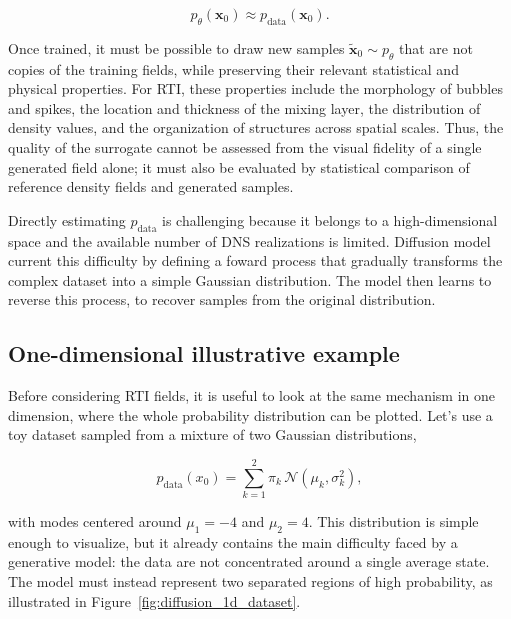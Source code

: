 \begin{equation}
    p_{\theta}(\mathbf{x}_0)\approx
    p_{\mathrm{data}}(\mathbf{x}_0).
\end{equation}

Once trained, it must be possible to draw new samples
$\widetilde{\mathbf{x}}_0\sim p_{\theta}$ that are not copies of the training
fields, while preserving their relevant statistical and physical properties.
For RTI, these properties include the morphology of bubbles and spikes, the
location and thickness of the mixing layer, the distribution of density values,
and the organization of structures across spatial scales. Thus, the quality of
the surrogate cannot be assessed from the visual fidelity of a single generated
field alone; it must also be evaluated by statistical comparison of reference density fields and generated samples.

Directly estimating $p_{\mathrm{data}}$ is challenging because it belongs
to a high-dimensional space and the available number of DNS realizations is limited.
Diffusion model current this difficulty by defining a foward process that gradually transforms the complex dataset into a simple Gaussian distribution. The model then learns to reverse this process, to recover samples from the original distribution.


\subsection{One-dimensional illustrative example}

Before considering RTI fields, it is useful to look at the same mechanism in
one dimension, where the whole probability distribution can be plotted. Let's use a toy dataset sampled from a
mixture of two Gaussian distributions,

\begin{equation}
    p_{\mathrm{data}}(x_0)
    =
    \sum_{k=1}^{2}
    \pi_k\,
    \mathcal{N}(\mu_k,\sigma_k^2),
\end{equation}

with modes centered around $\mu_1=-4$ and $\mu_2=4$. This distribution is
simple enough to visualize, but it already contains the main difficulty faced
by a generative model: the data are not concentrated around a single average
state. The model must instead represent two separated regions of high
probability, as illustrated in Figure~\ref{fig:diffusion_1d_dataset}.

